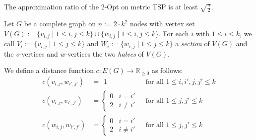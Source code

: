 \documentclass[aspectratio=169,slidestop,mathserif]{beamer}
\theoremstyle{definition}
\theoremstyle{remark}
\begin{document}
\begin{frame}{}
    \begin{theorem}
The approximation ratio of the 2-Opt on metric TSP is at least
$\sqrt{\frac{n}{2}}$.
\end{theorem}
\pause
Let $G$ be a complete graph on $n := 2\cdot k^2$ nodes with vertex set 
$V(G) := \{v_{i,j} \mid 1\le i,j \le k\} \cup \{w_{i,j} \mid 1\le i,j \le k\}$.
For each $i$ with $1\le i\le k$, we call $V_i := \{ v_{i,j} \mid 1\le j \le k \}$
and $W_i := \{ w_{i,j} \mid 1 \le j \le k \}$ a \emph{section} of $V(G)$
and the $v$-vertices and $w$-vertices the two \emph{halves} of $V(G)$.

We define a distance function $c:E(G)\to\mathbb{R}_{\ge 0}$ as follows:
\begin{align*}
c(v_{i,j}, w_{i',j'}) & =  ~~1  & \mbox{ for all } 1 \le i, i', j, j' \le k \\
c(v_{i,j}, v_{i',j'}) & = 
  \begin{cases}
  0 & i = i' \\
  2 & i \neq i'
  \end{cases} & \mbox{ for all } 1 \le j, j' \le k \\
c(w_{i,j}, w_{i',j'}) & = 
  \begin{cases}
  0 & i = i' \\
  2 & i \neq i'
  \end{cases} & \mbox{ for all } 1 \le j, j' \le k 
\end{align*}

\end{frame}
\end{document}
